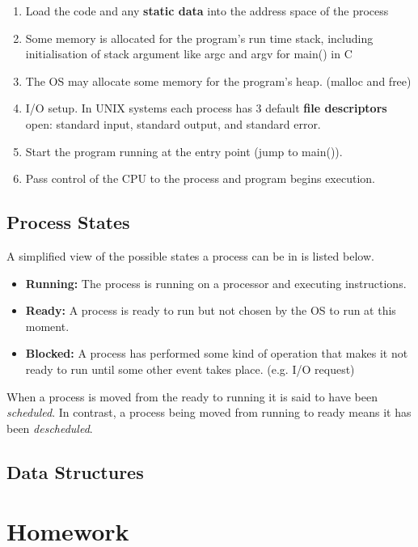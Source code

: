 \documentclass[12pt]{article}
\begin{document}
\begin{enumerate}
  \item Load the code and any \textbf{static data} into the address space of the process
  \item Some memory is allocated for the program's run time stack, including initialisation of stack argument like argc and argv for main() in C
  \item The OS may allocate some memory for the program's heap. (malloc and free) 
  \item I/O setup. In UNIX systems each process has 3 default \textbf{file descriptors} open: standard input, standard output, and standard error. 
  \item Start the program running at the entry point (jump to main()).
  \item Pass control of the CPU to the process and program begins execution.
\end{enumerate}

\subsection{Process States}
A simplified view of the possible states a process can be in is listed below.

\begin{itemize}
  \item \textbf{Running:} The process is running on a processor and executing instructions. 
  \item \textbf{Ready:} A process is ready to run but not chosen by the OS to run at this moment.
  \item \textbf{Blocked:} A process has performed some kind of operation that makes it not ready to run until some other event takes place. (e.g. I/O request)
\end{itemize}

When a process is moved from the ready to running it is said to have been \textit{scheduled}. In contrast, a process being moved from running to ready means it has been \textit{descheduled}. 

\subsection{Data Structures}

\section{Homework}
\end{document}
